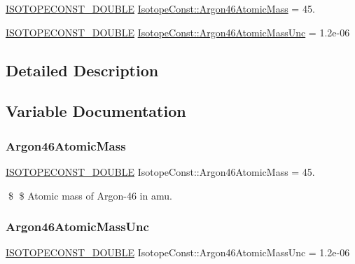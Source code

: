 \begin{DoxyCompactItemize}
\item 
\mbox{\hyperlink{group___isotope_const-_macros_ga8f45a7272ce02c0b4c65c44636ed719a}{I\+S\+O\+T\+O\+P\+E\+C\+O\+N\+S\+T\+\_\+\+D\+O\+U\+B\+LE}} \mbox{\hyperlink{group___isotope_const-_argon-_ar46_gafcbef038a7431905127d0ee3e01c630f}{Isotope\+Const\+::\+Argon46\+Atomic\+Mass}} = 45.
\item 
\mbox{\hyperlink{group___isotope_const-_macros_ga8f45a7272ce02c0b4c65c44636ed719a}{I\+S\+O\+T\+O\+P\+E\+C\+O\+N\+S\+T\+\_\+\+D\+O\+U\+B\+LE}} \mbox{\hyperlink{group___isotope_const-_argon-_ar46_ga47b81ef4b35b3ce75929f2fd26dcc26b}{Isotope\+Const\+::\+Argon46\+Atomic\+Mass\+Unc}} = 1.\+2e-\/06
\end{DoxyCompactItemize}


\subsection{Detailed Description}


\subsection{Variable Documentation}
\mbox{\label{group___isotope_const-_argon-_ar46_gafcbef038a7431905127d0ee3e01c630f}} 
\subsubsection{\texorpdfstring{Argon46\+Atomic\+Mass}{Argon46AtomicMass}}
{\footnotesize\ttfamily \mbox{\hyperlink{group___isotope_const-_macros_ga8f45a7272ce02c0b4c65c44636ed719a}{I\+S\+O\+T\+O\+P\+E\+C\+O\+N\+S\+T\+\_\+\+D\+O\+U\+B\+LE}} Isotope\+Const\+::\+Argon46\+Atomic\+Mass = 45.}

\$ \$ Atomic mass of Argon-\/46 in amu. \mbox{\label{group___isotope_const-_argon-_ar46_ga47b81ef4b35b3ce75929f2fd26dcc26b}} 
\subsubsection{\texorpdfstring{Argon46\+Atomic\+Mass\+Unc}{Argon46AtomicMassUnc}}
{\footnotesize\ttfamily \mbox{\hyperlink{group___isotope_const-_macros_ga8f45a7272ce02c0b4c65c44636ed719a}{I\+S\+O\+T\+O\+P\+E\+C\+O\+N\+S\+T\+\_\+\+D\+O\+U\+B\+LE}} Isotope\+Const\+::\+Argon46\+Atomic\+Mass\+Unc = 1.\+2e-\/06}

